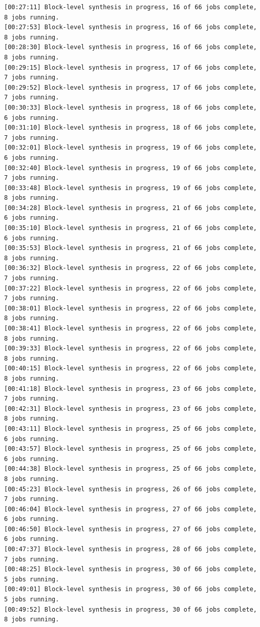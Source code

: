 \begin{lstlisting}
[00:27:11] Block-level synthesis in progress, 16 of 66 jobs complete, 8 jobs running.
[00:27:53] Block-level synthesis in progress, 16 of 66 jobs complete, 8 jobs running.
[00:28:30] Block-level synthesis in progress, 16 of 66 jobs complete, 8 jobs running.
[00:29:15] Block-level synthesis in progress, 17 of 66 jobs complete, 7 jobs running.
[00:29:52] Block-level synthesis in progress, 17 of 66 jobs complete, 7 jobs running.
[00:30:33] Block-level synthesis in progress, 18 of 66 jobs complete, 6 jobs running.
[00:31:10] Block-level synthesis in progress, 18 of 66 jobs complete, 7 jobs running.
[00:32:01] Block-level synthesis in progress, 19 of 66 jobs complete, 6 jobs running.
[00:32:40] Block-level synthesis in progress, 19 of 66 jobs complete, 7 jobs running.
[00:33:48] Block-level synthesis in progress, 19 of 66 jobs complete, 8 jobs running.
[00:34:28] Block-level synthesis in progress, 21 of 66 jobs complete, 6 jobs running.
[00:35:10] Block-level synthesis in progress, 21 of 66 jobs complete, 6 jobs running.
[00:35:53] Block-level synthesis in progress, 21 of 66 jobs complete, 8 jobs running.
[00:36:32] Block-level synthesis in progress, 22 of 66 jobs complete, 7 jobs running.
[00:37:22] Block-level synthesis in progress, 22 of 66 jobs complete, 7 jobs running.
[00:38:01] Block-level synthesis in progress, 22 of 66 jobs complete, 8 jobs running.
[00:38:41] Block-level synthesis in progress, 22 of 66 jobs complete, 8 jobs running.
[00:39:33] Block-level synthesis in progress, 22 of 66 jobs complete, 8 jobs running.
[00:40:15] Block-level synthesis in progress, 22 of 66 jobs complete, 8 jobs running.
[00:41:18] Block-level synthesis in progress, 23 of 66 jobs complete, 7 jobs running.
[00:42:31] Block-level synthesis in progress, 23 of 66 jobs complete, 8 jobs running.
[00:43:11] Block-level synthesis in progress, 25 of 66 jobs complete, 6 jobs running.
[00:43:57] Block-level synthesis in progress, 25 of 66 jobs complete, 6 jobs running.
[00:44:38] Block-level synthesis in progress, 25 of 66 jobs complete, 8 jobs running.
[00:45:23] Block-level synthesis in progress, 26 of 66 jobs complete, 7 jobs running.
[00:46:04] Block-level synthesis in progress, 27 of 66 jobs complete, 6 jobs running.
[00:46:50] Block-level synthesis in progress, 27 of 66 jobs complete, 6 jobs running.
[00:47:37] Block-level synthesis in progress, 28 of 66 jobs complete, 7 jobs running.
[00:48:25] Block-level synthesis in progress, 30 of 66 jobs complete, 5 jobs running.
[00:49:01] Block-level synthesis in progress, 30 of 66 jobs complete, 5 jobs running.
[00:49:52] Block-level synthesis in progress, 30 of 66 jobs complete, 8 jobs running.

\end{lstlisting}
